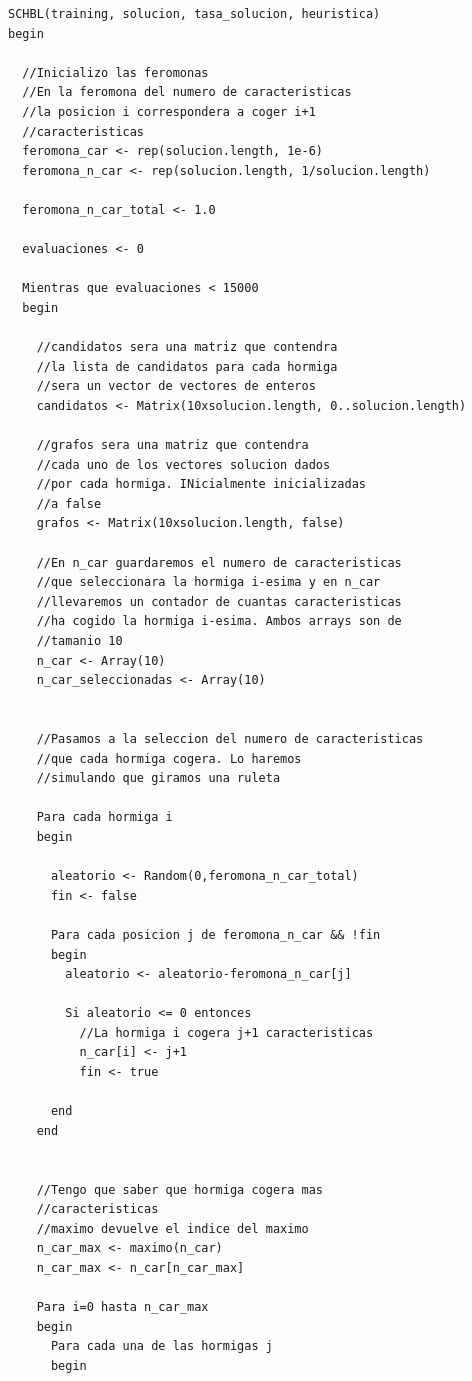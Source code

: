 \begin{lstlisting}
SCHBL(training, solucion, tasa_solucion, heuristica)
begin
  
  //Inicializo las feromonas
  //En la feromona del numero de caracteristicas
  //la posicion i correspondera a coger i+1
  //caracteristicas
  feromona_car <- rep(solucion.length, 1e-6)
  feromona_n_car <- rep(solucion.length, 1/solucion.length)
  
  feromona_n_car_total <- 1.0
  
  evaluaciones <- 0
  
  Mientras que evaluaciones < 15000
  begin
  
    //candidatos sera una matriz que contendra
    //la lista de candidatos para cada hormiga
    //sera un vector de vectores de enteros
    candidatos <- Matrix(10xsolucion.length, 0..solucion.length)
    
    //grafos sera una matriz que contendra
    //cada uno de los vectores solucion dados
    //por cada hormiga. INicialmente inicializadas
    //a false
    grafos <- Matrix(10xsolucion.length, false)
    
    //En n_car guardaremos el numero de caracteristicas
    //que seleccionara la hormiga i-esima y en n_car
    //llevaremos un contador de cuantas caracteristicas
    //ha cogido la hormiga i-esima. Ambos arrays son de
    //tamanio 10
    n_car <- Array(10)
    n_car_seleccionadas <- Array(10)
    
    
    //Pasamos a la seleccion del numero de caracteristicas
    //que cada hormiga cogera. Lo haremos
    //simulando que giramos una ruleta
    
    Para cada hormiga i
    begin
      
      aleatorio <- Random(0,feromona_n_car_total)
      fin <- false
      
      Para cada posicion j de feromona_n_car && !fin
      begin
        aleatorio <- aleatorio-feromona_n_car[j]
        
        Si aleatorio <= 0 entonces
          //La hormiga i cogera j+1 caracteristicas
          n_car[i] <- j+1
          fin <- true
        
      end
    end
          
    
    //Tengo que saber que hormiga cogera mas
    //caracteristicas
    //maximo devuelve el indice del maximo
    n_car_max <- maximo(n_car)
    n_car_max <- n_car[n_car_max]
    
    Para i=0 hasta n_car_max
    begin
      Para cada una de las hormigas j
      begin
      

\end{lstlisting}

